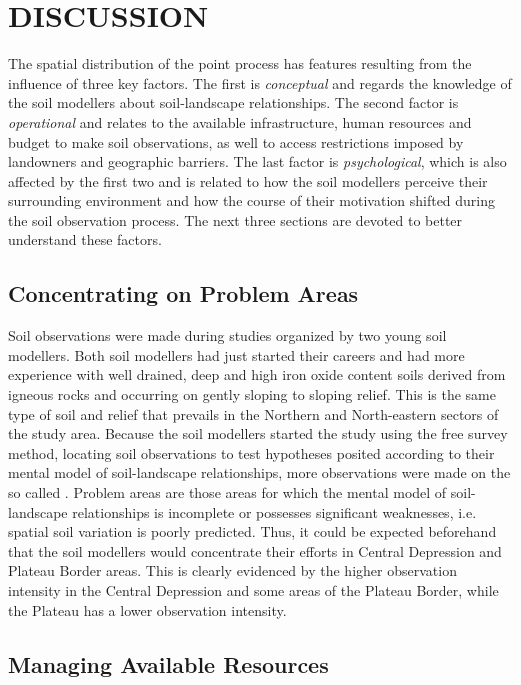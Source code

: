 \section{DISCUSSION}

The spatial distribution of the point process has features resulting from the influence of three key factors. 
The first is \textit{conceptual} and regards the knowledge of the soil modellers about soil-landscape 
relationships. The second factor is \textit{operational} and relates to the available infrastructure, human 
resources and budget to make soil observations, as well to access restrictions imposed by landowners and 
geographic barriers. The last factor is \textit{psychological}, which is also affected by the first two and is 
related to how the soil modellers perceive their surrounding environment and how the course of their 
motivation shifted during the soil observation process. The next three sections are devoted to better 
understand these factors.

\subsection{Concentrating on Problem Areas}
\label{subsec:chap07-conceptual}

Soil observations were made during studies organized by two young soil modellers. Both soil modellers had just 
started their careers and had more experience with well drained, deep and high iron oxide content soils 
derived from igneous rocks and occurring on gently sloping to sloping relief. This is the same type of soil and
relief that prevails in the Northern and North-eastern sectors of the study area. Because the soil 
modellers started the study using the free survey method, locating soil observations to test hypotheses 
posited according to their mental model of soil-landscape relationships, more observations were made on the so 
called  \cite{Rossiter2000}. Problem areas are those areas for which the mental model of 
soil-landscape relationships is incomplete or possesses significant weaknesses, i.e. spatial soil variation is 
poorly predicted. Thus, it could be expected beforehand that the soil modellers would concentrate their 
efforts in Central Depression and Plateau Border areas. This is clearly evidenced by the higher observation 
intensity in the Central Depression and some areas of the Plateau Border, while the Plateau has a lower 
observation intensity.

\subsection{Managing Available Resources}

